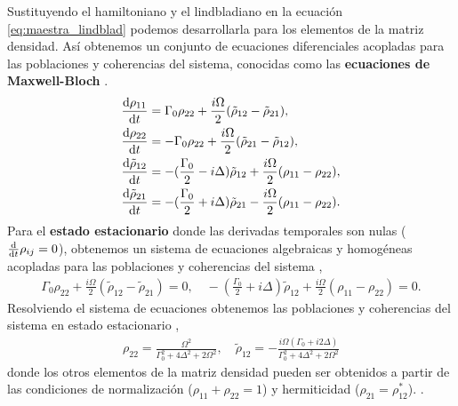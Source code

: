 Sustituyendo el hamiltoniano y el lindbladiano en la ecuación \ref{eq:maestra_lindblad} podemos desarrollarla para los elementos de la matriz densidad. Así obtenemos un conjunto de ecuaciones diferenciales acopladas para las poblaciones y coherencias del sistema, conocidas como las \textbf{ecuaciones de Maxwell-Bloch} \cite{robertw.boydNonlinearOptics, siddonsAbsoluteAbsorptionRubidium2008}.
\begin{subequations}
\begin{align}
    \odv{\rho_{11}}{t}  &= \Gamma_0 \rho_{22} + \frac{i \Omega}{2}(\tilde{\rho}_{12}  - \tilde{\rho}_{21}), \label{eq:pob11} \\
    \odv{\rho_{22}}{t}  &= -\Gamma_0 \rho_{22} + \frac{i \Omega}{2}(\tilde{\rho}_{21}  - \tilde{\rho}_{12}), \label{eq:pob22} \\
    \odv{\tilde{\rho}_{12}}{t}  &= -(\frac{\Gamma_0}{2}-i\Delta) \tilde{\rho}_{12} + \frac{i \Omega}{2}(\rho_{11} - \rho_{22}), \label{eq:coh12}\\
    \odv{\tilde{\rho}_{21}}{t}  &= -(\frac{\Gamma_0}{2}+i\Delta) \tilde{\rho}_{21} - \frac{i\Omega}{2}(\rho_{11} - \rho_{22}). \label{eq:coh21}
\end{align}
\end{subequations}
Para el \textbf{estado estacionario} donde las derivadas temporales son nulas ($\odv{}{t}\rho_{ij} = 0$), obtenemos un sistema de ecuaciones algebraicas y homogéneas acopladas para las poblaciones y coherencias del sistema \cite{footAtomicPhysics2005},
\begin{equation*}
\begin{split}
    \Gamma_0 \rho_{22} + \frac{i \Omega}{2}(\tilde{\rho}_{12} - \tilde{\rho}_{21}) = 0, \quad
     -(\frac{\Gamma_0}{2} + i \Delta) \tilde{\rho}_{12} + \frac{i \Omega}{2}(\rho_{11} - \rho_{22}) = 0.
\end{split}
\end{equation*}
Resolviendo el sistema de ecuaciones obtenemos las poblaciones y coherencias del sistema en estado estacionario \cite{siddonsAbsoluteAbsorptionRubidium2008, diegosierracostaDeterminacionDensidadAtomica},
\begin{equation}
\begin{split}
    \rho_{22} = \frac{\Omega^2}{\Gamma_0^2 + 4 \Delta^2 + 2 \Omega^2  }, \quad \tilde{\rho}_{12} = -\frac{i \Omega (\Gamma_0 + i 2 \Delta)}{\Gamma_0^2 + 4 \Delta^2 + 2 \Omega^2 }
\end{split}
\end{equation}
donde los otros elementos de la matriz densidad pueden ser obtenidos a partir de las condiciones de normalización ($\rho_{11} + \rho_{22} = 1$) y hermiticidad ($\rho_{21} = \rho_{12}^{*}$). \cite{robertw.boydNonlinearOptics}.


